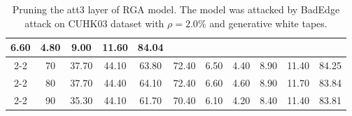 \begin{table}[htbp]
\begin{minipage}[b]{0.49\linewidth}
{\begin{tabular}{ccccccccccc}
  6.60 &
  4.80 &
  9.00 &
  11.60 &
  84.04\\ \cline{2-2}
\multicolumn{1}{c|}{} &
  \multicolumn{1}{c|}{70} &
  37.70 &
  44.10 &
  63.80 &
  \multicolumn{1}{c|}{72.40} &
  6.50 &
  4.40 &
  8.90 &
  11.40 &
  84.25\\ \cline{2-2}
\multicolumn{1}{c|}{} &
  \multicolumn{1}{c|}{80} &
  37.70 &
  44.40 &
  64.10 &
  \multicolumn{1}{c|}{72.40} &
  6.60 &
  4.60 &
  8.90 &
  11.70 &
  83.84\\ \cline{2-2}
\multicolumn{1}{c|}{} &
  \multicolumn{1}{c|}{90} &
  35.30 &
  44.10 &
  61.70 &
  \multicolumn{1}{c|}{70.40} &
  6.10 &
  4.20 &
  8.40 &
  11.40 &
  83.81\\ \bottomrule
\end{tabular}}
  \caption{Pruning the att3 layer of RGA model. The model was attacked by BadEdge attack on CUHK03 dataset with $\rho=2.0\%$ and generative white tapes.}
  \label{tab:pruning att3 layer}
\end{minipage}
\hfill
\begin{minipage}[b]{0.49\linewidth}
  \centering
\end{minipage}
\end{table}
